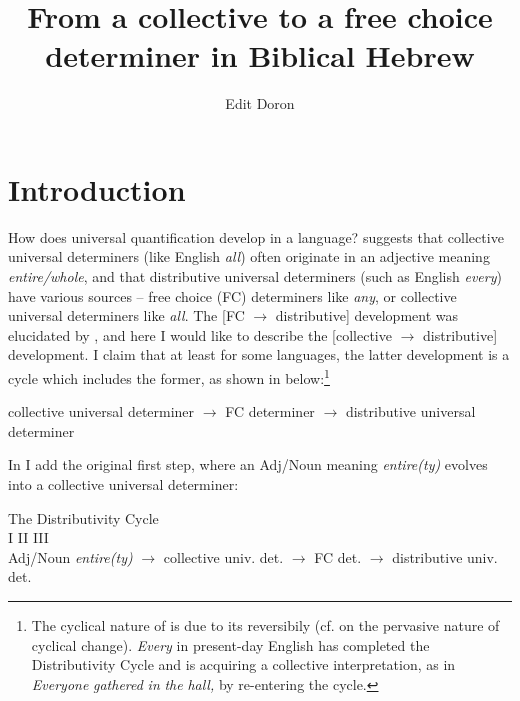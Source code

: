 \documentclass[output=paper]{langsci/langscibook}
\title{From a collective to a free choice determiner in Biblical Hebrew}
\author{Edit Doron\affiliation{Hebrew University of Jerusalem}}
\begin{document}
\maketitle


\section{Introduction}

How does universal quantification develop in a language? \citet{Haspelmath1995}  suggests that collective universal determiners (like English \textit{all}) often originate in an adjective meaning \textit{entire/whole}, and that distributive universal determiners (such as English \textit{every}) have various sources – free choice (FC) determiners like \textit{any}, or collective universal determiners like \textit{all}. The [FC ${\rightarrow}$ distributive] development was elucidated by \citet{Beck2017}, and here I would like to describe the [collective ${\rightarrow}$ distributive] development. I claim that at least for some languages, the latter development is a cycle which includes the former, as shown in  below:\footnote{\textrm{The cyclical nature of  is due to its reversibily} (cf. \citealt{Gelderen2011} on the pervasive nature of cyclical change). \textrm{\textit{Every}} \textrm{in present-day English} has completed the Distributivity Cycle and is acquiring a collective interpretation, as in \textit{Everyone} \textit{gathered} \textit{in} \textit{the} \textit{hall,} by re-entering the cycle.}

\ea%
    \label{ex:doron:1}
            collective universal determiner  ${\rightarrow}$   FC determiner  ${\rightarrow}$  distributive universal determiner
\z


In  I add the original first step, where an Adj/Noun meaning \textit{entire(ty)} \linebreak evolves into a collective universal determiner:

\ea%
    The Distributivity Cycle\label{ex:doron:2}\\
    \gll\relax                        {}                        I                 {}                    II         {}          III\\
                   {Adj/Noun \textit{entire(ty)}}  ${\rightarrow}$  {collective univ. det.}
                   ${\rightarrow}$   {FC det.}  ${\rightarrow}$  {distributive univ. det.} \\
    \z
\end{document}
